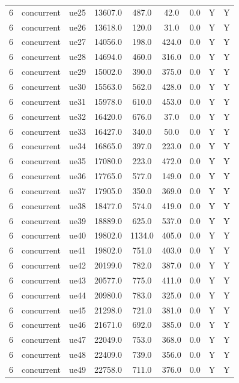 \begin{table}[ht]
\begin{tabular}{|c|c|c|c|c|c|c|c|c|}
6 & concurrent & ue25 & 13607.0 & 487.0 & 42.0 & 0.0 & Y & Y \\
6 & concurrent & ue26 & 13618.0 & 120.0 & 31.0 & 0.0 & Y & Y \\
6 & concurrent & ue27 & 14056.0 & 198.0 & 424.0 & 0.0 & Y & Y \\
6 & concurrent & ue28 & 14694.0 & 460.0 & 316.0 & 0.0 & Y & Y \\
6 & concurrent & ue29 & 15002.0 & 390.0 & 375.0 & 0.0 & Y & Y \\
6 & concurrent & ue30 & 15563.0 & 562.0 & 428.0 & 0.0 & Y & Y \\
6 & concurrent & ue31 & 15978.0 & 610.0 & 453.0 & 0.0 & Y & Y \\
6 & concurrent & ue32 & 16420.0 & 676.0 & 37.0 & 0.0 & Y & Y \\
6 & concurrent & ue33 & 16427.0 & 340.0 & 50.0 & 0.0 & Y & Y \\
6 & concurrent & ue34 & 16865.0 & 397.0 & 223.0 & 0.0 & Y & Y \\
6 & concurrent & ue35 & 17080.0 & 223.0 & 472.0 & 0.0 & Y & Y \\
6 & concurrent & ue36 & 17765.0 & 577.0 & 149.0 & 0.0 & Y & Y \\
6 & concurrent & ue37 & 17905.0 & 350.0 & 369.0 & 0.0 & Y & Y \\
6 & concurrent & ue38 & 18477.0 & 574.0 & 419.0 & 0.0 & Y & Y \\
6 & concurrent & ue39 & 18889.0 & 625.0 & 537.0 & 0.0 & Y & Y \\
6 & concurrent & ue40 & 19802.0 & 1134.0 & 405.0 & 0.0 & Y & Y \\
6 & concurrent & ue41 & 19802.0 & 751.0 & 403.0 & 0.0 & Y & Y \\
6 & concurrent & ue42 & 20199.0 & 782.0 & 387.0 & 0.0 & Y & Y \\
6 & concurrent & ue43 & 20577.0 & 775.0 & 411.0 & 0.0 & Y & Y \\
6 & concurrent & ue44 & 20980.0 & 783.0 & 325.0 & 0.0 & Y & Y \\
6 & concurrent & ue45 & 21298.0 & 721.0 & 381.0 & 0.0 & Y & Y \\
6 & concurrent & ue46 & 21671.0 & 692.0 & 385.0 & 0.0 & Y & Y \\
6 & concurrent & ue47 & 22049.0 & 753.0 & 368.0 & 0.0 & Y & Y \\
6 & concurrent & ue48 & 22409.0 & 739.0 & 356.0 & 0.0 & Y & Y \\
6 & concurrent & ue49 & 22758.0 & 711.0 & 376.0 & 0.0 & Y & Y \\

\end{tabular}
\end{table}
